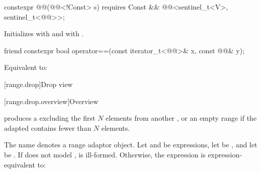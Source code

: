 %
\begin{itemdecl}
constexpr @@(@@<!Const> s)
  requires Const && @@<sentinel_t<V>, sentinel_t<@@>>;
\end{itemdecl}

\begin{itemdescr}
\pnum
\effects
Initializes  with  and
 with .
\end{itemdescr}

%
\begin{itemdecl}
friend constexpr bool operator==(const iterator_t<@@>& x, const @@& y);
\end{itemdecl}

\begin{itemdescr}
\pnum
\effects
Equivalent to:
\end{itemdescr}

[range.drop]{Drop view}

[range.drop.overview]{Overview}

\pnum
{} produces a 
excluding the first $N$ elements from another , or
an empty range if the adapted  contains fewer than $N$ elements.

\pnum
The name  denotes
a range adaptor object.
Let  and  be expressions,
let  be , and
let  be .
If  does not model
,
 is ill-formed.
Otherwise, the expression 
is expression-equivalent to:

